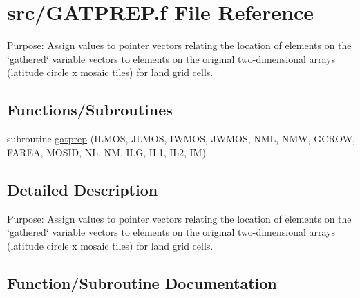 \hypertarget{GATPREP_8f}{}\section{src/\+G\+A\+T\+P\+R\+E\+P.f File Reference}
\label{GATPREP_8f}


Purpose\+: Assign values to pointer vectors relating the location of elements on the \char`\"{}gathered\char`\"{} variable vectors to elements on the original two-\/dimensional arrays (latitude circle x mosaic tiles) for land grid cells.  


\subsection*{Functions/\+Subroutines}
\begin{DoxyCompactItemize}
\item 
subroutine \hyperlink{GATPREP_8f_a4f34017ff2fe00ba9298f7c75c23492a}{gatprep} (I\+L\+M\+O\+S, J\+L\+M\+O\+S, I\+W\+M\+O\+S, J\+W\+M\+O\+S, N\+M\+L, N\+M\+W, G\+C\+R\+O\+W, F\+A\+R\+E\+A, M\+O\+S\+I\+D, N\+L, N\+M, I\+L\+G, I\+L1, I\+L2, I\+M)
\end{DoxyCompactItemize}


\subsection{Detailed Description}
Purpose\+: Assign values to pointer vectors relating the location of elements on the \char`\"{}gathered\char`\"{} variable vectors to elements on the original two-\/dimensional arrays (latitude circle x mosaic tiles) for land grid cells. 



\subsection{Function/\+Subroutine Documentation}
\hypertarget{GATPREP_8f_a4f34017ff2fe00ba9298f7c75c23492a}{}
